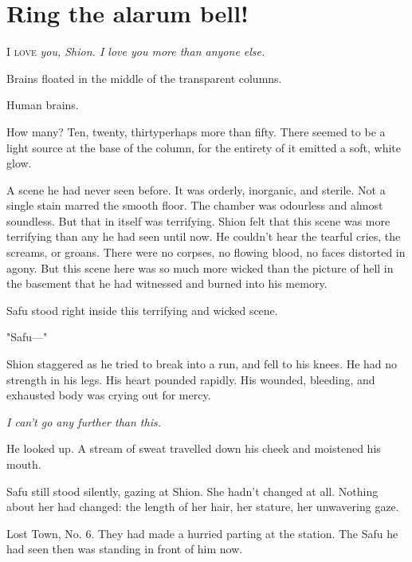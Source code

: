
\chapter{Ring the alarum bell!}


\lettrine{I}{ love} \emph{you, Shion. I love you more than anyone else.}

\mybreak

Brains floated in the middle of the transparent columns.

Human brains.

How many? Ten, twenty, thirty\el perhaps more than fifty. There seemed
to be a light source at the base of the column, for the entirety of it
emitted a soft, white glow.

A scene he had never seen before. It was orderly, inorganic, and
sterile. Not a single stain marred the smooth floor. The chamber was
odourless and almost soundless. But that in itself was terrifying. Shion
felt that this scene was more terrifying than any he had seen until now.
He couldn't hear the tearful cries, the screams, or groans. There were
no corpses, no flowing blood, no faces distorted in agony. But this
scene here was so much more wicked than the picture of hell in the
basement that he had witnessed and burned into his memory.

Safu stood right inside this terrifying and wicked scene.

"Safu---"

Shion staggered as he tried to break into a run, and fell to his knees.
He had no strength in his legs. His heart pounded rapidly. His wounded,
bleeding, and exhausted body was crying out for mercy.

\emph{I can't go any further than this.}

He looked up. A stream of sweat travelled down his cheek and moistened
his mouth.

Safu still stood silently, gazing at Shion. She hadn't changed at all.
Nothing about her had changed: the length of her hair, her stature, her
unwavering gaze.

Lost Town, No. 6. They had made a hurried parting at the station. The
Safu he had seen then was standing in front of him now.


